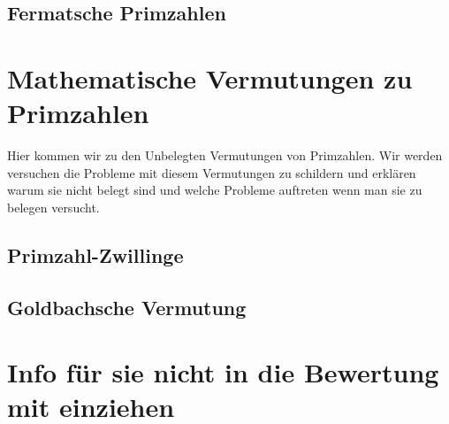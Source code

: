 \documentclass[11pt]{article}
\begin{document}
\subsection{Fermatsche Primzahlen}
\newpage
\section{Mathematische Vermutungen zu Primzahlen}
Hier kommen wir zu den Unbelegten Vermutungen von Primzahlen. Wir werden versuchen die Probleme mit diesem Vermutungen zu schildern und erklären warum sie nicht belegt sind und welche Probleme auftreten wenn man sie zu belegen versucht.
\subsection{Primzahl-Zwillinge}
\newpage
\subsection{Goldbachsche Vermutung}
\newpage
\section*{Info für sie nicht in die Bewertung mit einziehen}

\end{document}
